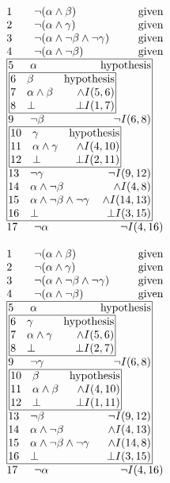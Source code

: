 \documentclass[11pt,twoside,a4paper]{report}
\begin{document}
\begin{figure}[htp]
\begin{minipage}[c]{.5\linewidth}
\[\vbox{\offinterlineskip\halign{
&\tabskip=1.5em#\strut&$#$\hfil\tabskip=1em&\hfil$#$\tabskip=0em\cr
%
1&\neg(\alpha\wedge\beta)&\mbox{given}\cr
2&\neg(\alpha\wedge\gamma)&\mbox{given}\cr
3&\neg(\alpha\wedge\neg\beta\wedge\neg\gamma)&\mbox{given}\cr
4&\neg(\alpha\wedge\neg\beta)&\mbox{given}\cr
%
\multispan3\vbox{\halign{
\vrule#&&\hskip.1em\tabskip=1em#\strut&$#$\hfil\tabskip=1em&\hfil$#$\hskip0.1em\tabskip=0em&\vrule#\cr
\noalign{\hrule}
%
&5&\alpha&\mbox{hypothesis}&\cr
%
&\multispan3\,\vbox{\halign{
\vrule#&&\hskip.1em\tabskip=1em#\strut&$#$\hfil\tabskip=1em&\hfil$#$\hskip0.1em\tabskip=0em&\vrule#\cr
\noalign{\hrule}
%
&6&\beta&\mbox{hypothesis}&\cr
&7&\alpha\wedge\beta&\wedge I(5,6)&\cr
&8&\bot&\bot I(1,7)&\cr
%
\noalign{\hrule}}}\,&\cr
%
&9&\neg\beta&\neg I(6,8)&\cr
%
&\multispan3\,\vbox{\halign{
\vrule#&&\hskip.1em\tabskip=1em#\strut&$#$\hfil\tabskip=1em&\hfil$#$\hskip0.1em\tabskip=0em&\vrule#\cr
\noalign{\hrule}
%
&10&\gamma&\mbox{hypothesis}&\cr
&11&\alpha\wedge\gamma&\wedge I(4,10)&\cr
&12&\bot&\bot I(2,11)&\cr
%
\noalign{\hrule}}}\,&\cr
%
&13&\neg\gamma&\neg I(9,12)&\cr
&14&\alpha\wedge\neg\beta&\wedge I(4,8)&\cr
&15&\alpha\wedge\neg\beta\wedge\neg\gamma&\wedge I(14,13)&\cr
&16&\bot&\bot I(3,15)&\cr
%
\noalign{\hrule}}}\,\cr
%
17&\neg\alpha&\neg I(4,16)\cr
}}\]
\end{minipage}%
\begin{minipage}[c]{.5\linewidth}
\[\vbox{\offinterlineskip\halign{
&\tabskip=1.5em#\strut&$#$\hfil\tabskip=1em&\hfil$#$\tabskip=0em\cr
%
1&\neg(\alpha\wedge\beta)&\mbox{given}\cr
2&\neg(\alpha\wedge\gamma)&\mbox{given}\cr
3&\neg(\alpha\wedge\neg\beta\wedge\neg\gamma)&\mbox{given}\cr
4&\neg(\alpha\wedge\neg\beta)&\mbox{given}\cr
%
\multispan3\vbox{\halign{
\vrule#&&\hskip.1em\tabskip=1em#\strut&$#$\hfil\tabskip=1em&\hfil$#$\hskip0.1em\tabskip=0em&\vrule#\cr
\noalign{\hrule}
%
&5&\alpha&\mbox{hypothesis}&\cr
%
&\multispan3\,\vbox{\halign{
\vrule#&&\hskip.1em\tabskip=1em#\strut&$#$\hfil\tabskip=1em&\hfil$#$\hskip0.1em\tabskip=0em&\vrule#\cr
\noalign{\hrule}
%
&6&\gamma&\mbox{hypothesis}&\cr
&7&\alpha\wedge\gamma&\wedge I(5,6)&\cr
&8&\bot&\bot I(2,7)&\cr
%
\noalign{\hrule}}}\,&\cr
%
&9&\neg\gamma&\neg I(6,8)&\cr
%
&\multispan3\,\vbox{\halign{
\vrule#&&\hskip.1em\tabskip=1em#\strut&$#$\hfil\tabskip=1em&\hfil$#$\hskip0.1em\tabskip=0em&\vrule#\cr
\noalign{\hrule}
%
&10&\beta&\mbox{hypothesis}&\cr
&11&\alpha\wedge\beta&\wedge I(4,10)&\cr
&12&\bot&\bot I(1,11)&\cr
%
\noalign{\hrule}}}\,&\cr
%
&13&\neg\beta&\neg I(9,12)&\cr
&14&\alpha\wedge\neg\beta&\wedge I(4,13)&\cr
&15&\alpha\wedge\neg\beta\wedge\neg\gamma&\wedge I(14,8)&\cr
&16&\bot&\bot I(3,15)&\cr
%
\noalign{\hrule}}}\,\cr
%
17&\neg\alpha&\neg I(4,16)\cr
}}\]
\end{minipage}


\end{figure}
\end{document}
